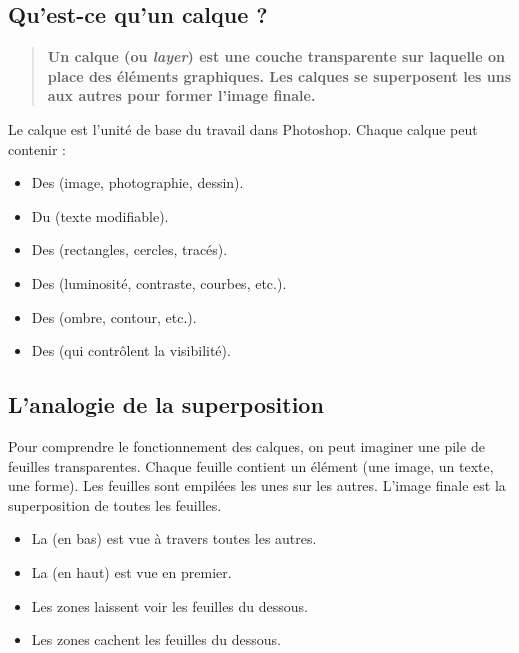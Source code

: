 \subsection{Qu'est-ce qu'un calque ?}

\begin{quote}
\textbf{Un calque (ou \emph{layer}) est une couche transparente sur laquelle on place des éléments graphiques. Les calques se superposent les uns aux autres pour former l'image finale.}
\end{quote}

Le calque est l'unité de base du travail dans Photoshop. Chaque calque peut contenir :

\begin{itemize}
    \item Des  (image, photographie, dessin).
    \item Du  (texte modifiable).
    \item Des  (rectangles, cercles, tracés).
    \item Des  (luminosité, contraste, courbes, etc.).
    \item Des  (ombre, contour, etc.).
    \item Des  (qui contrôlent la visibilité).
\end{itemize}

\subsection{L'analogie de la superposition}

Pour comprendre le fonctionnement des calques, on peut imaginer une pile de feuilles transparentes. Chaque feuille contient un élément (une image, un texte, une forme). Les feuilles sont empilées les unes sur les autres. L'image finale est la superposition de toutes les feuilles.

\begin{itemize}
    \item La  (en bas) est vue à travers toutes les autres.
    \item La  (en haut) est vue en premier.
    \item Les zones  laissent voir les feuilles du dessous.
    \item Les zones  cachent les feuilles du dessous.
\end{itemize}

